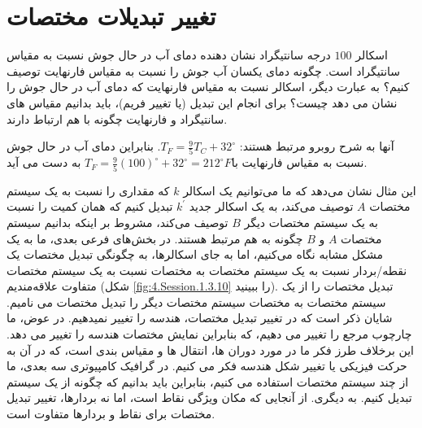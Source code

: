 \section{\textbf{تغییر تبدیلات مختصات}}
\label{sec:3.4}
{
    \Large
    \begin{spacing}{1.5}
        اسکالر $100$ درجه سانتیگراد نشان دهنده دمای آب در حال جوش نسبت به مقیاس سانتیگراد است.
        چگونه دمای یکسان آب جوش را نسبت به مقیاس فارنهایت توصیف کنیم؟ به عبارت دیگر، اسکالر نسبت به مقیاس فارنهایت که دمای آب در حال جوش را نشان می دهد چیست؟ برای انجام این تبدیل (یا تغییر فریم)، ​​باید بدانیم مقیاس های سانتیگراد و فارنهایت چگونه با هم ارتباط دارند.

        آنها به شرح روبرو مرتبط هستند:
        $T_{F}=\frac{\displaystyle 9}{\displaystyle 5}T_{C}+32^\circ$. بنابراین دمای آب در حال جوش نسبت به مقیاس فارنهایت با$T_{F}=\frac{\displaystyle 9}{\displaystyle 5}(100)^\circ+32^\circ=212^\circ F$ به دست می آید.

        این مثال نشان می‌دهد که ما می‌توانیم یک اسکالر $k$ که مقداری را نسبت به یک سیستم مختصات $A$ توصیف می‌کند،
        به یک اسکالر جدید $k^\prime$ تبدیل کنیم که همان کمیت را نسبت به یک سیستم مختصات دیگر $B$ توصیف می‌کند،
        مشروط بر اینکه بدانیم سیستم مختصات $A$ و  $B$ چگونه به هم مرتبط هستند.
        در بخش‌های فرعی بعدی، ما به یک مشکل مشابه نگاه می‌کنیم، اما به جای اسکالرها، به چگونگی تبدیل مختصات یک نقطه/بردار نسبت به یک سیستم مختصات به مختصات نسبت به یک سیستم مختصات متفاوت علاقه‌مندیم (شکل \ref{fig:4.Session.1.3.10} را ببینید).
        تبدیل مختصات را از یک سیستم مختصات به مختصات سیستم مختصات دیگر را تبدیل مختصات می نامیم.
        شایان ذکر است که در تغییر تبدیل مختصات، هندسه را تغییر نمیدهیم. در عوض، ما چارچوب مرجع را تغییر می دهیم، که بنابراین نمایش مختصات هندسه را تغییر می دهد.
        این برخلاف طرز فکر ما در مورد دوران ها، انتقال ها و مقیاس بندی است، که در آن به حرکت فیزیکی یا تغییر شکل هندسه فکر می کنیم.
        در گرافیک کامپیوتری سه بعدی، ما از چند سیستم مختصات استفاده می کنیم، بنابراین باید بدانیم که چگونه از یک سیستم تبدیل کنیم.
        به دیگری. از آنجایی که مکان ویژگی نقاط است، اما نه بردارها، تغییر تبدیل مختصات برای نقاط و بردارها متفاوت است.


\end{spacing}}
